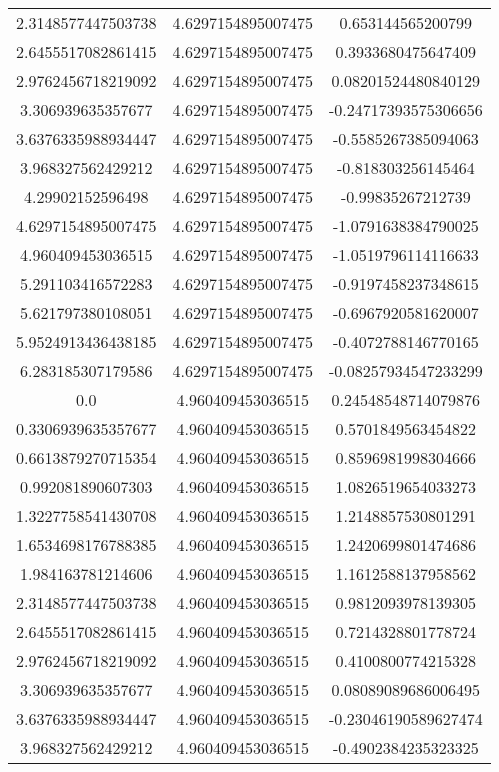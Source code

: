 \begin{table}
\begin{tabular}{ccc}
2.3148577447503738 & 4.6297154895007475 & 0.653144565200799 \\
2.6455517082861415 & 4.6297154895007475 & 0.3933680475647409 \\
2.9762456718219092 & 4.6297154895007475 & 0.08201524480840129 \\
3.306939635357677 & 4.6297154895007475 & -0.24717393575306656 \\
3.6376335988934447 & 4.6297154895007475 & -0.5585267385094063 \\
3.968327562429212 & 4.6297154895007475 & -0.818303256145464 \\
4.29902152596498 & 4.6297154895007475 & -0.99835267212739 \\
4.6297154895007475 & 4.6297154895007475 & -1.0791638384790025 \\
4.960409453036515 & 4.6297154895007475 & -1.0519796114116633 \\
5.291103416572283 & 4.6297154895007475 & -0.9197458237348615 \\
5.621797380108051 & 4.6297154895007475 & -0.6967920581620007 \\
5.9524913436438185 & 4.6297154895007475 & -0.4072788146770165 \\
6.283185307179586 & 4.6297154895007475 & -0.08257934547233299 \\
0.0 & 4.960409453036515 & 0.24548548714079876 \\
0.3306939635357677 & 4.960409453036515 & 0.5701849563454822 \\
0.6613879270715354 & 4.960409453036515 & 0.8596981998304666 \\
0.992081890607303 & 4.960409453036515 & 1.0826519654033273 \\
1.3227758541430708 & 4.960409453036515 & 1.2148857530801291 \\
1.6534698176788385 & 4.960409453036515 & 1.2420699801474686 \\
1.984163781214606 & 4.960409453036515 & 1.1612588137958562 \\
2.3148577447503738 & 4.960409453036515 & 0.9812093978139305 \\
2.6455517082861415 & 4.960409453036515 & 0.7214328801778724 \\
2.9762456718219092 & 4.960409453036515 & 0.4100800774215328 \\
3.306939635357677 & 4.960409453036515 & 0.08089089686006495 \\
3.6376335988934447 & 4.960409453036515 & -0.23046190589627474 \\
3.968327562429212 & 4.960409453036515 & -0.4902384235323325 \\

\end{tabular}
\end{table}
